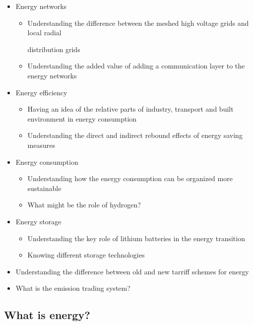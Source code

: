 \documentclass[../summary.tex]{subfiles}
\begin{document}
\begin{itemize}
		\item Energy networks
		\begin{itemize}
			\item Understanding the difference between the meshed high voltage grids and local radial 
			
			distribution grids
			\item Understanding the added value of adding a communication layer to the energy networks
		\end{itemize}
		
		\item Energy efficiency
		\begin{itemize}
			\item Having an idea of the relative parts of industry, transport and built environment in energy consumption
			\item Understanding the direct and indirect rebound effects of energy saving measures
		\end{itemize}
		
		\item Energy consumption
		\begin{itemize}
			\item Understanding how the energy consumption can be organized more sustainable
			\item What might be the role of hydrogen?
		\end{itemize}
		
		\item Energy storage
		\begin{itemize}
			\item Understanding the key role of lithium batteries in the energy transition
			\item Knowing different storage technologies
		\end{itemize}
		
		
		\item Understanding the difference between old and new tarriff schemes for energy
		\item What is the emission trading system?
	\end{itemize}
	\newpage
	\subsection{What is energy?}
	
\end{document}
